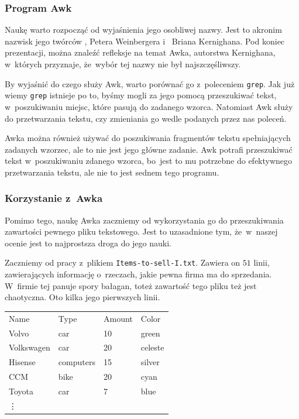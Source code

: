 \documentclass[10pt,t]{beamer}
\begin{document}
\begin{frame}
  \frametitle{Program Awk}


  Naukę  warto rozpocząć
  od wyjaśnienia jego osobliwej nazwy. Jest to akronim nazwisk jego twórców
  ,
  {Petera Weinbergera}
  i~
  {Briana Kernighana}. Pod koniec prezentacji, można znaleźć refleksje
  na temat Awka, autorstwa Kernighana, w~których przyznaje, że~wybór tej
  nazwy nie był najszczęśliwszy.

  By wyjaśnić do czego służy Awk, warto porównać go z~poleceniem
  \texttt{grep}. Jak już wiemy \texttt{grep} istnieje po to, byśmy mogli
  za jego pomocą przeszukiwać tekst, w~poszukiwaniu miejsc, które pasują do
  zadanego wzorca. Natomiast Awk służy do \alert{przetwarzania} tekstu, czy
  zmieniania go wedle podanych przez nas poleceń.

  Awka można również używać do poszukiwania fragmentów tekstu spełniających
  zadanych wzorzec, ale to nie jest jego główne zadanie. Awk potrafi
  przeszukiwać tekst w~poszukiwaniu zdanego wzorca, bo~jest to mu potrzebne
  do efektywnego przetwarzania tekstu, ale nie to jest sednem tego programu.

\end{frame}





\begin{frame}
  \frametitle{Korzystanie z~Awka}


  Pomimo tego, naukę Awka zaczniemy od wykorzystania go do przeszukiwania
  zawartości pewnego pliku tekstowego. Jest to uzasadnione tym, że~w~naszej
  ocenie jest to najprostsza droga do jego nauki.

  Zaczniemy od pracy z~plikiem \texttt{Items-to-sell-I.txt}. Zawiera on
  $51$ linii, zawierających informację o~rzeczach, jakie pewna firma ma do
  sprzedania. W~firmie tej panuje spory bałagan, toteż zawartość tego
  pliku też jest chaotyczna. Oto kilka jego pierwszych linii.

  \begin{tabular}{l l l l}
    Name & Type & Amount & Color \\
    Volvo & car & 10 & green \\
    Volkswagen & car & 20 & celeste \\
    Hisense & computers & 15 & silver \\
    CCM & bike & 20 & cyan \\
    Toyota & car & 7  & blue \\
    \hspace{2em} \vdots & & &
  \end{tabular}

\end{frame}
\end{document}
